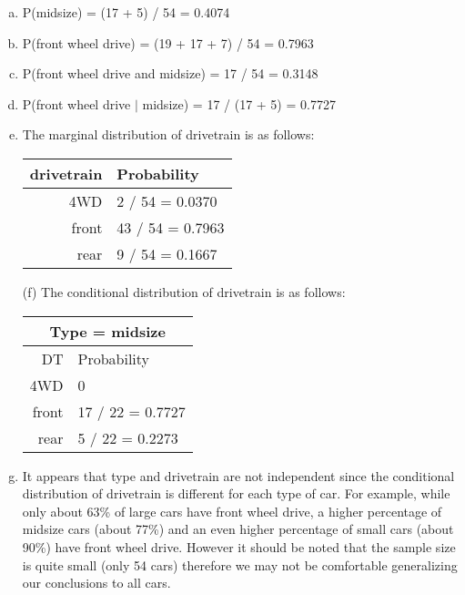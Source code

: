 {
\begin{enumerate}[(a)]
\setlength{\itemsep}{0mm}
\item P(midsize) = (17 + 5) / 54 = 0.4074
\item P(front wheel drive) = (19 + 17 + 7) / 54 = 0.7963
\item P(front wheel drive and midsize) = 17 / 54 = 0.3148
\item P(front wheel drive $|$ midsize) = 17 / (17 + 5) = 0.7727
\item The marginal distribution of drivetrain
 is as follows: \\

\begin{tabular}{r | l}
drivetrain
 & Probability \\
\hline
4WD		& 2 / 54 = 0.0370 \\
front		& 43 / 54 = 0.7963 \\
rear		& 9 / 54 = 0.1667
\end{tabular}
\item[(f)] The conditional distribution of drivetrain
 is as follows: \\

\begin{tabular}{r | l}
\multicolumn{2}{c}{Type = midsize} \\
\hline
DT & Probability \\
\hline
4WD		& 0 \\
front		& 17 / 22 = 0.7727 \\
rear		& 5 / 22 = 0.2273
\end{tabular}

\item It appears that type and drivetrain are not independent since the conditional distribution of drivetrain is different for each type of car. For example, while only about 63\% of large cars have front wheel drive, a higher percentage of midsize cars (about 77\%) and an even higher percentage of small cars (about 90\%) have front wheel drive. However it should be noted that the sample size is quite small (only 54 cars) therefore we may not be comfortable generalizing our conclusions to all cars.
\end{enumerate}
}



